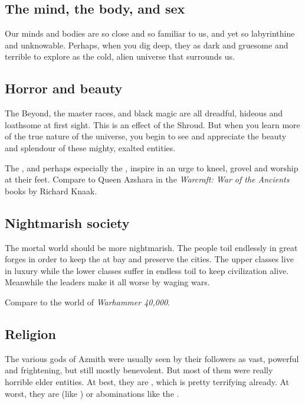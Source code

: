 \subsection{The mind, the body, and sex}
Our minds and bodies are so close and so familiar to us, and yet so labyrinthine and unknowable. 
Perhaps, when you dig deep, they as dark and gruesome and terrible to explore as the cold, alien universe that surrounds us. 







\subsection{Horror and beauty}
The Beyond, the master races, \daemons{} and black magic are all dreadful, hideous and loathsome at first sight. 
This is an effect of the Shroud. 
But when you learn more of the true nature of the universe, you begin to see and appreciate the beauty and splendour of these mighty, exalted entities. 

The \resphain, and perhaps especially the \resviel, inspire in \humans{} an urge to kneel, grovel and worship at their feet. 
Compare to Queen Azshara in the \emph{Warcraft: War of the Ancients} books by Richard Knaak. 









\subsection{Nightmarish society}
The mortal world should be more nightmarish. 
The people toil endlessly in great forges in order to keep the \wylde at bay and preserve the
cities. 
The upper classes live in luxury while the lower classes suffer in endless toil to keep civilization alive. 
Meanwhile the leaders make it all worse by waging wars.

Compare to the world of \emph{Warhammer 40,000}. 








\subsection{Religion}
The various gods of Azmith were usually seen by their followers as vast, powerful and frightening, but still mostly benevolent.
But most of them were really horrible elder entities. 
At best, they are \dragons, which is pretty terrifying already.
At worst, they are \xss (like ) or abominations like the \sephiroth. 

